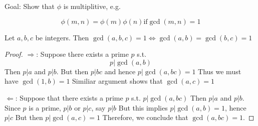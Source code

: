 
Goal: Show that $\phi$ is multiplitive, e.g.
\begin{eg}
    \[
        \phi(m, n) = \phi(m) \phi(n)
        \text{if} \gcd(m, n) = 1
    \]
\end{eg}

\begin{lemma}
    Let $a, b, c$ be integers.
    Then $\gcd(a, b, c) = 1 \Leftrightarrow \gcd(a, b) = \gcd(b, c) = 1$
\end{lemma}
\begin{proof}
    $\Rightarrow$:
    Suppose there exists a prime $p$ s.t.
    \[
        p | \gcd(a, b)
    \]
    Then $p | a$ and $p | b$. But then $p | bc$ and hence $p | \gcd(a, bc) = 1$
    Thus we must have $\gcd(1, b) = 1$
    Similiar argument shows that $\gcd(a, c) = 1$

    $\Leftarrow$:
    Suppose that there exists a prime $p$ s.t. $p | \gcd(a, bc)$
    Then $p | a$ and $p | b$.
    Since $p$ is a prime, $p | b$ or $p | c$, say $p | b$
    But this implies $p | \gcd(a, b) = 1$, hence $p | c$
    But then $p | \gcd(a, c) = 1$
    Therefore, we conclude that $\gcd(a, bc) = 1$.
\end{proof}

